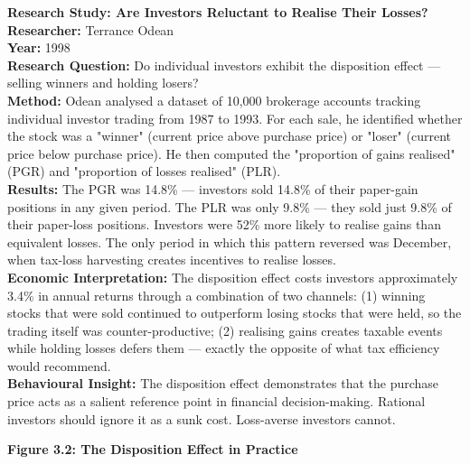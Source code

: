 \documentclass[12pt, letterpaper]{article}
\begin{document}
\begin{researchbox}
\textbf{Research Study: Are Investors Reluctant to Realise Their Losses?}\\[4pt]

\textbf{Researcher:} Terrance Odean\\[4pt]
\textbf{Year:} 1998\\[4pt]
\textbf{Research Question:} Do individual investors exhibit the disposition effect --- selling winners and holding losers?\\[4pt]
\textbf{Method:} Odean analysed a dataset of 10,000 brokerage accounts tracking individual investor trading from 1987 to 1993. For each sale, he identified whether the stock was a "winner" (current price above purchase price) or "loser" (current price below purchase price). He then computed the "proportion of gains realised" (PGR) and "proportion of losses realised" (PLR).\\[4pt]
\textbf{Results:} The PGR was 14.8\% --- investors sold 14.8\% of their paper-gain positions in any given period. The PLR was only 9.8\% --- they sold just 9.8\% of their paper-loss positions. Investors were 52\% more likely to realise gains than equivalent losses. The only period in which this pattern reversed was December, when tax-loss harvesting creates incentives to realise losses.\\[4pt]
\textbf{Economic Interpretation:} The disposition effect costs investors approximately 3.4\% in annual returns through a combination of two channels: (1) winning stocks that were sold continued to outperform losing stocks that were held, so the trading itself was counter-productive; (2) realising gains creates taxable events while holding losses defers them --- exactly the opposite of what tax efficiency would recommend.\\[4pt]
\textbf{Behavioural Insight:} The disposition effect demonstrates that the purchase price acts as a salient reference point in financial decision-making. Rational investors should ignore it as a sunk cost. Loss-averse investors cannot.\\[4pt]
\end{researchbox}

\newpage
\textbf{Figure 3.2: The Disposition Effect in Practice}
\end{document}
